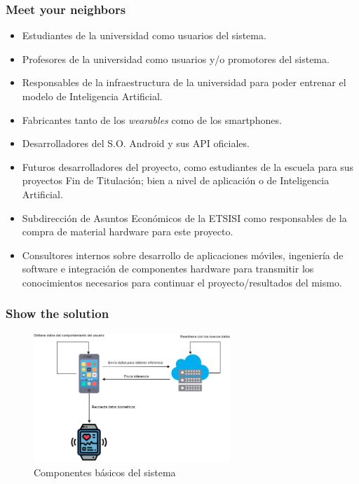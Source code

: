             \subsubsection{Meet your neighbors}
                \vspace{-\topsep+5mm}
                \begin{itemize}
                    \item Estudiantes de la universidad como usuarios del sistema.
                    \item Profesores de la universidad como usuarios y/o promotores del sistema.
                    \item Responsables de la infraestructura de la universidad para poder entrenar el modelo de Inteligencia Artificial.
                    \item Fabricantes tanto de los \textit{wearables} como de los smartphones.
                    \item Desarrolladores del S.O. Android y sus API oficiales.
                    \item Futuros desarrolladores del proyecto, como estudiantes de la escuela para sus proyectos Fin de Titulación; bien a nivel de aplicación o de Inteligencia Artificial.
                    \item Subdirección de Asuntos Económicos de la ETSISI como responsables de la compra de material hardware para este proyecto.
                    \item Consultores internos sobre desarrollo de aplicaciones móviles, ingeniería de software e integración de componentes hardware para transmitir los conocimientos necesarios para continuar el proyecto/resultados del mismo.
                \end{itemize}
                
            \subsubsection{Show the solution}
                
                \vspace*{5mm}
                \begin{figure}[H]
                    \centering
                    \includegraphics[width=0.66\textwidth]{figures/inception-deck/Componentes.png}
                    \caption{Componentes básicos del sistema}
                    \label{fig:dev:componentes}
                \end{figure}
                
